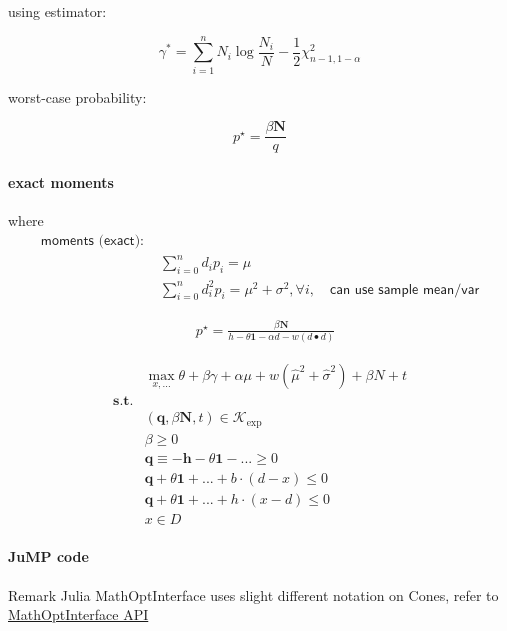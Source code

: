 \documentclass[
  10pt,
  a4paper,
,tablecaptionabove
]{scrartcl}
\renewenvironment{quote}{\begin{customblockquote}\list{}{\rightmargin=0em\leftmargin=0em}%
\item\relax\color{blockquote-text}\ignorespaces}{\unskip\unskip\endlist\end{customblockquote}}
\begin{document}
using estimator:

\[\gamma^{*}=\sum_{i=1}^{n} N_{i} \log \frac{N_{i}}{N}-\frac{1}{2} \chi_{n-1,1-\alpha}^{2}\]

worst-case probability:

\[p^\star = \frac{\beta \mathbf N}{q}\]

\hypertarget{exact-moments}{%
\paragraph{exact moments}\label{exact-moments}}

where \[\begin{aligned} 
  \textsf{moments (exact): } & \\
 & \sum_{i=0}^{n} d_{i} p_{i} = \mu \\ 
 & \sum_{i=0}^{n} d_{i}^2 p_{i} = \mu^2 +\sigma^2, \forall i, \quad \textsf{can use sample mean/var}
 \end{aligned}\]

\[\begin{aligned}
  & p^\star = \frac{\beta\mathbf N}{h - \theta \mathbf 1 - \alpha d - w(d\bullet d)}
\end{aligned}\]

\[\begin{aligned}
  & \max_{x, ...} 
  \theta + \beta \gamma + \alpha \mu + w(\hat \mu^2 + \hat \sigma^2) +\beta N + t \\
  \textbf {s.t.} \\
  & (\mathbf q, \beta\mathbf N, t) \in \mathcal K_{\exp} \\
  & \beta \ge 0 \\
  & \mathbf q \equiv - \mathbf h - \theta \mathbf 1 - ...\ge 0\\
  & \mathbf q + \theta \mathbf 1 + ...+  b\cdot(d - x) \le 0\\
  & \mathbf q +  \theta \mathbf 1 + ... + h\cdot(x - d) \le 0\\
  & x \in D 
\end{aligned}\]

\hypertarget{jump-code}{%
\paragraph{JuMP code}\label{jump-code}}

\begin{quote}
Remark Julia MathOptInterface uses slight different notation on Cones,
refer to
\href{https://jump.dev/MathOptInterface.jl/v0.9.1/apireference/\#MathOptInterface.ExponentialCone}{MathOptInterface
API}
\end{quote}
\end{document}
